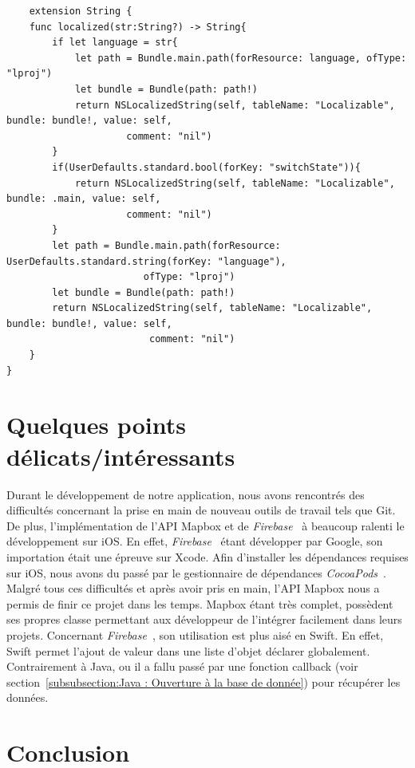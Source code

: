 \documentclass{article}
\begin{document}
\begin{verbatim}
    extension String {
    func localized(str:String?) -> String{
        if let language = str{
            let path = Bundle.main.path(forResource: language, ofType: "lproj")
            let bundle = Bundle(path: path!)
            return NSLocalizedString(self, tableName: "Localizable", bundle: bundle!, value: self,
            		 comment: "nil")
        }
        if(UserDefaults.standard.bool(forKey: "switchState")){
            return NSLocalizedString(self, tableName: "Localizable", bundle: .main, value: self,
            		 comment: "nil")
        }
        let path = Bundle.main.path(forResource: UserDefaults.standard.string(forKey: "language"), 
        				ofType: "lproj")
        let bundle = Bundle(path: path!)
        return NSLocalizedString(self, tableName: "Localizable", bundle: bundle!, value: self,
        				 comment: "nil")
    }
}  
\end{verbatim}


\newpage %


\section{Quelques points délicats/intéressants}

Durant le développement de notre application, nous avons rencontrés des difficultés concernant la prise en main
de nouveau outils de travail tels que Git.
De plus, l'implémentation de l'API Mapbox et de \textit{Firebase}~\cite{firebaseDoc} à beaucoup ralenti
le développement sur iOS. En effet, \textit{Firebase}~\cite{firebaseDoc} étant développer par Google, son importation
était une épreuve sur Xcode. Afin d'installer les dépendances requises sur iOS, nous avons du passé par
le gestionnaire de dépendances \textit{CocoaPods}~\cite{cocoapodsDoc}.
Malgré tous ces difficultés et après avoir pris en main, l'API Mapbox nous a permis de finir ce projet dans les temps.
Mapbox étant très complet, possèdent ses propres classe permettant aux développeur de l'intégrer facilement dans leurs
projets.
Concernant \textit{Firebase}~\cite{firebaseDoc}, son utilisation est plus aisé en Swift. En effet, Swift permet
l'ajout de valeur dans une liste d'objet déclarer globalement. Contrairement à Java, ou il a fallu passé par une
fonction callback (voir section~\ref{subsubsection:Java : Ouverture à la base de donnée}) pour récupérer les données.



\section{Conclusion}




\end{document}

